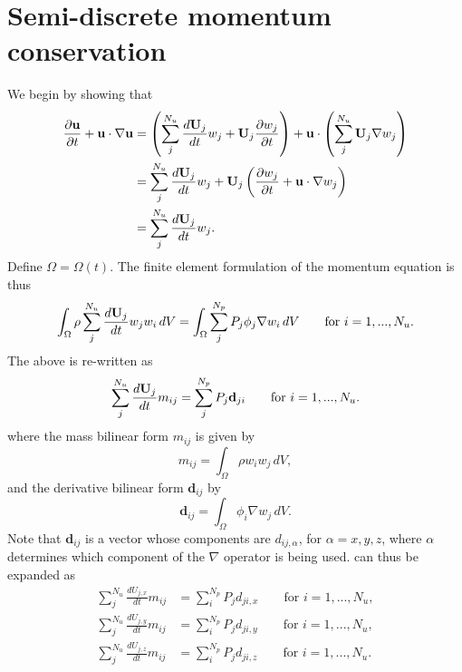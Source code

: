 \documentclass[11pt]{article}
\begin{document}
\section{Semi-discrete momentum conservation}
We begin by showing that
\begin{align}
    \frac{\partial \mathbf{u}}{\partial t} + \mathbf{u} \cdot \nabla \mathbf{u} &= \left ( \sum_j^{N_u} \frac{d \mathbf{U}_j}{d t} w_j + \mathbf{U}_j \frac{\partial w_j}{\partial t} \right ) + \mathbf{u} \cdot \left ( \sum_j^{N_u} \mathbf{U}_j \nabla w_j \right ) \nonumber \\
    &= \sum_j^{N_u} \frac{d \mathbf{U}_j}{d t} w_j + \mathbf{U}_j \left ( \frac{\partial w_j}{\partial t} + \mathbf{u} \cdot \nabla w_j \right ) \nonumber \\
    &= \sum_j^{N_u} \frac{d \mathbf{U}_j}{d t} w_j.
\end{align}
Define $\Omega = \Omega(t)$. The finite element formulation of the momentum equation is thus 
\begin{equation}
    \int_\Omega \rho \sum_j^{N_u} \frac{d \mathbf{U}_j}{d t} w_j w_i \, dV = \int_\Omega \sum_j^{N_p} P_j \phi_j \nabla w_i \, dV \qquad \text{for } i = 1,...,N_u.
\end{equation}
The above is re-written as
\begin{equation}
    \label{eq:semi_discrete_momentum_bilinear}
    \sum_j^{N_u} \frac{d \mathbf{U}_j}{d t} m_{ij} = \sum_j^{N_p} P_j \mathbf{d}_{ji} \qquad \text{for } i = 1,...,N_u.
\end{equation}
where the mass bilinear form $m_{ij}$ is given by 
\begin{equation}
    m_{ij} = \int_\Omega \rho w_i w_j \, dV,
\end{equation}
and the derivative bilinear form $\mathbf{d}_{ij}$ by 
\begin{equation}
    \mathbf{d}_{ij} = \int_\Omega \phi_i \nabla w_j \, dV.
\end{equation}
Note that $\mathbf{d}_{ij}$ is a vector whose components are $d_{ij,\alpha}$, for $\alpha = x,y,z$, where $\alpha$ determines which component of the $\nabla$ operator is being used.  can thus be expanded as
\begin{align}
    \label{eq:semi_discrete_momentum_bilinear_expanded}
    \sum_j^{N_u} \frac{d U_{j,x}}{d t} m_{ij} &= \sum_i^{N_p} P_j d_{ji,x} \qquad \text{for } i = 1,...,N_u, \nonumber \\
    \sum_j^{N_u} \frac{d U_{j,y}}{d t} m_{ij} &= \sum_i^{N_p} P_j d_{ji,y} \qquad \text{for } i = 1,...,N_u, \nonumber \\
    \sum_j^{N_u} \frac{d U_{j,z}}{d t} m_{ij} &= \sum_i^{N_p} P_j d_{ji,z} \qquad \text{for } i = 1,...,N_u.
\end{align}
\end{document}
